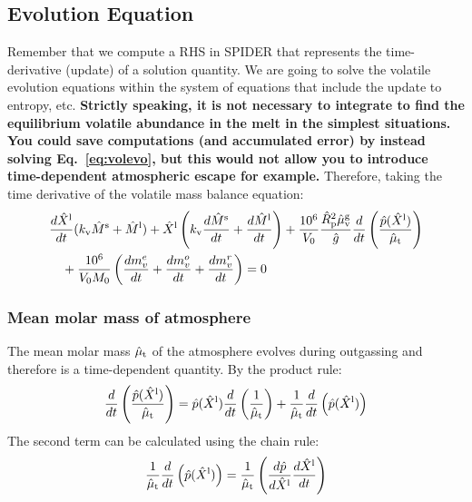 \subsection{Evolution Equation}
Remember that we compute a RHS in SPIDER that represents the time-derivative (update) of a solution quantity.  We are going to solve the volatile evolution equations within the system of equations that include the update to entropy, etc.  \textbf{Strictly speaking, it is not necessary to integrate to find the equilibrium volatile abundance in the melt in the simplest situations.  You could save computations (and accumulated error) by instead solving Eq.~\ref{eq:volevo}, but this would not allow you to introduce time-dependent atmospheric escape for example.}  Therefore, taking the time derivative of the volatile mass balance equation:
\begin{align}
&\frac{d \hat{X}^{\rm l}}{d t} (k_{\rm v} \hat{M}^{\rm s} + \hat{M}^{\rm l}) + \hat{X}^{\rm l} \left( k_{\rm v} \frac{d \hat{M}^{\rm s}}{d t} + \frac{d \hat{M}^{\rm l}}{d t} \right) + \frac{10^6}{V_0} \frac{\hat{R}_{\rm p}^2 \hat{\mu}_{\rm v}^{\rm g}}{\hat{g}} \frac{d}{dt} \left( \frac{\hat{p}(\hat{X}^{\rm l})}{\hat{\mu}_{\rm t}} \right)\\
&\quad + \frac{10^6}{V_0 M_0} \left( \frac{dm_v^e}{dt} +  \frac{dm_v^o}{dt} + \frac{dm_v^r}{dt} \right) = 0
\end{align}
\subsubsection{Mean molar mass of atmosphere}
The mean molar mass $\hat{\mu}_{\rm t}$ of the atmosphere evolves during outgassing and therefore is a time-dependent quantity.  By the product rule:
\begin{equation}
\frac{d}{dt} \left( \frac{\hat{p}(\hat{X}^{\rm l})}{\hat{\mu}_{\rm t}} \right) = \hat{p}(\hat{X}^{\rm l}) \frac{d}{dt} \left( \frac{1}{\hat{\mu}_{\rm t}} \right) + \frac{1}{\hat{\mu}_{\rm t}} \frac{d}{dt} \left( \hat{p}(\hat{X}^{\rm l}) \right)
\label{eq:atmos_evo}
\end{equation}
The second term can be calculated using the chain rule:
\begin{equation}
\frac{1}{\hat{\mu}_{\rm t}} \frac{d}{dt} \left( \hat{p}(\hat{X}^{\rm l}) \right) = \frac{1}{\hat{\mu}_{\rm t}} \left( \frac{d \hat{p}}{d \hat{X}^{\rm l}} \frac{d \hat{X}^{\rm l}}{d t} \right)
\end{equation}
